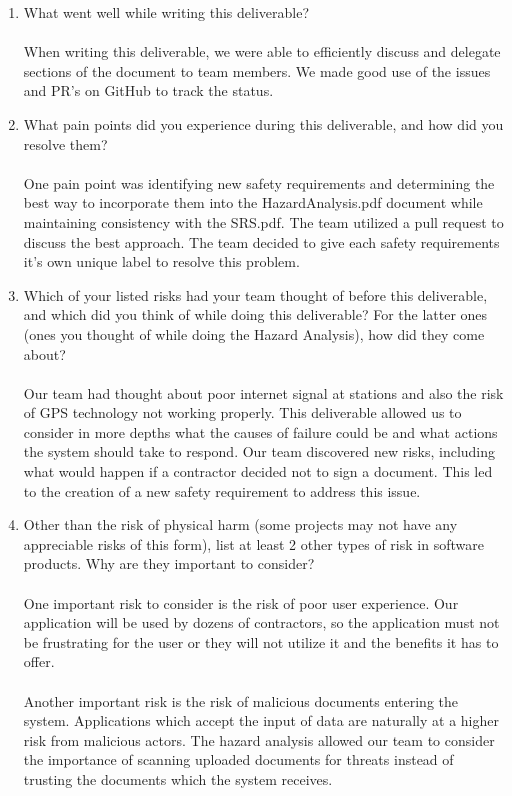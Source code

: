 \documentclass{article}
\begin{document}
\begin{enumerate}
  \item What went well while writing this deliverable?\\
    \\
    When writing this deliverable, we were able to efficiently discuss and
    delegate sections of the document to team members. We made good use of the
    issues and PR's on GitHub to track the status.
  \item What pain points did you experience during this deliverable, and how
    did you resolve them?\\
    \\
    One pain point was identifying new safety requirements and determining
    the best way to incorporate them into the HazardAnalysis.pdf
    document while maintaining
    consistency with the SRS.pdf. The team utilized a pull request to discuss
    the best approach. The team decided to give each safety requirements it's
    own unique label to resolve this problem.
  \item Which of your listed risks had your team thought of before this
    deliverable, and which did you think of while doing this deliverable? For
    the latter ones (ones you thought of while doing the Hazard Analysis), how
    did they come about?\\
    \\
    Our team had thought about poor internet signal at stations and also the
    risk of GPS technology not working properly. This deliverable allowed us to
    consider in more depths what the causes of failure could be and what actions
    the system should take to respond. Our team discovered new risks, including
    what would happen if a contractor decided not to sign a document. This led
    to the creation of a new safety requirement to address this issue.
  \item Other than the risk of physical harm (some projects may not have any
    appreciable risks of this form), list at least 2 other types of risk in
    software products. Why are they important to consider?\\
    \\
    One important risk to consider is the risk of poor user
    experience. Our application
    will be used by dozens of contractors, so the application
    must not be frustrating for the user or they will not utilize it
    and the benefits it has to offer.\\
    \\
    Another important risk is the risk of malicious documents entering the
    system. Applications which accept the input of data are naturally
    at a higher risk from malicious actors. The hazard analysis allowed our
    team to consider the importance of scanning uploaded documents for threats
    instead of trusting the documents which the system receives.
\end{enumerate}
\end{document}

